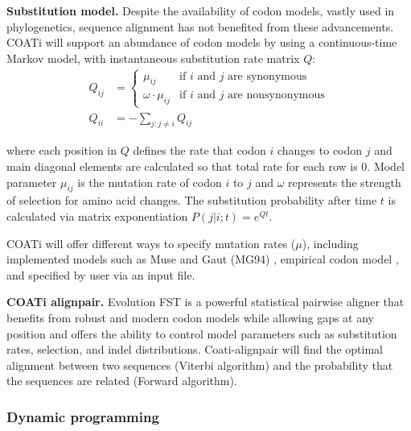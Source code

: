 \vspace{2em}

\textbf{Substitution model.}
Despite the availability of codon models, vastly used in phylogenetics, sequence
alignment has not benefited from these advancements.
COATi will support an abundance of codon models by using a continuous-time
Markov model, with instantaneous substitution rate matrix $Q$:
\begin{align*} Q_{ij} &= \begin{cases}
    \mu_{ij} & \text{if $i$ and $j$ are synonymous}\\
    \omega \cdot \mu_{ij} & \text{if $i$ and $j$ are nonsynonymous}
    \end{cases}\\[10pt]
   Q_{ii} &= -\sum_{j:j \neq i} Q_{ij}
\end{align*}

where each position in $Q$ defines the rate that codon $i$ changes to codon $j$
and main diagonal elements are calculated so that total rate for each row is 0.
Model parameter $\mu_{ij}$ is the mutation rate of codon $i$ to $j$ and $\omega$
represents the strength of selection for amino acid changes.
The substitution probability after time $t$ is calculated via matrix
exponentiation $P(j|i;t) = e^{Qt}$.

COATi will offer different ways to specify mutation rates ($\mu$), including
implemented models such as Muse and Gaut (MG94) , empirical codon model
, and specified by user via an input file.

\textbf{COATi alignpair.}
Evolution FST is a powerful statistical pairwise aligner that benefits from
robust and modern codon models while allowing gaps at any position and offers
the ability to control model parameters such as substitution rates, selection,
and indel distributions.
Coati-alignpair will find the optimal alignment between two sequences (Viterbi
algorithm) and the probability that the sequences are related (Forward algorithm).

\subsubsection{Dynamic programming}

